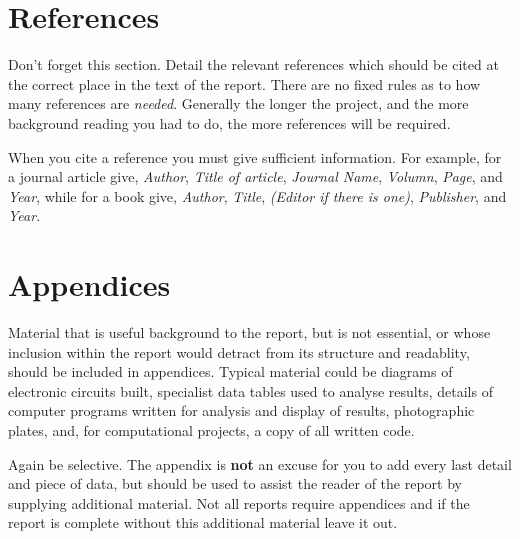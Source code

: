 \documentclass[a4paper,12pt]{article}
\begin{document}
 





 

\section{References}

Don't forget this section. Detail the relevant references which
should be cited at the correct place in the text of the report. There
are no fixed rules as to how many references are {\it needed}. Generally
the longer the project, and the more background reading you had to do,
the more references will be required. 

When you cite a reference you must give sufficient information. For
example, for a journal article give, {\it Author}, {\it Title of
article},
{\it Journal Name}, {\it Volumn}, {\it Page}, and {\it Year}, 
while for a book give, {\it Author}, {\it Title},
{\it (Editor if there is one)}, {\it Publisher}, and {\it Year}.        
\appendix
\section{Appendices}

Material that is useful background to the report, but is not essential,
or whose inclusion within the report  would detract from its
structure and readablity, should be included in appendices. Typical
material could be diagrams of electronic circuits built, specialist
data tables used to analyse results, details of computer programs
written for analysis and display of results, photographic plates,
and, for computational projects, a copy of all written code.

Again be selective. The appendix is {\bf not} an excuse for you to add every
last detail and piece of data, but should be used to assist the reader
of the report by supplying additional material. Not all reports require
appendices and if the report is complete without this additional
material leave it out.
\end{document}
